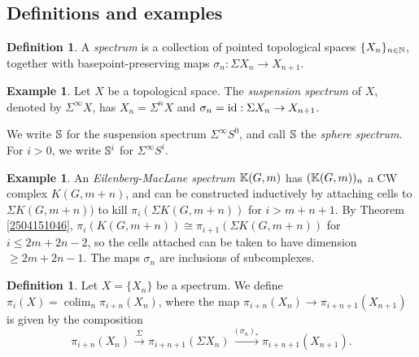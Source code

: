 \documentclass[11pt, titlepage]{article} %
\def\bb{\ensuremath\mathbb}
\def\nat{\ensuremath\mathbb{N}}
\def\id{\ensuremath\text{id}}
\DeclareMathOperator{\colim}{colim}
\numberwithin{equation}{subsection}
\theoremstyle{plain}
\theoremstyle{definition}
\newtheorem{definition}[theorem]{Definition}
\newtheorem{example}[theorem]{Example}
\begin{document}
\subsection{Definitions and examples}\label{2504291244}

\begin{definition}
A \textit{spectrum} is a collection of pointed topological spaces \(\{X_n\}_{n\in \nat}\), together with basepoint-preserving maps \(\sigma_n : \Sigma X_n \to X_{n+1}\).
\end{definition}

\begin{example}
Let \(X\) be a topological space. The \textit{suspension spectrum} of \(X\), denoted by \(\Sigma^\infty X\), has \(X_n=\Sigma^nX\) and \(\sigma_n=\id : \Sigma X_n \to X_{n+1}\).
\end{example}

We write \(\bb{S}\) for the suspension spectrum \(\Sigma^\infty S^0\), and call \(\bb{S}\) the \textit{sphere spectrum}. For \(i>0\), we write \(\bb{S}^i\) for \(\Sigma^\infty S^i\).%



\begin{example}\label{2504251659}
An \textit{Eilenberg-MacLane spectrum} \(\bb{K}(G,m)\) has \((\bb{K}(G,m))_n\) a CW complex \(K(G,m+n)\), and can be constructed inductively by attaching cells to \(\Sigma K(G, m+n))\) to kill \(\pi_i(\Sigma K(G, m+n))\) for \(i > m+n+1\). By Theorem \ref{2504151046}, \(\pi_i(K(G, m+n))\cong \pi_{i+1}(\Sigma K(G, m+n))\) for \(i \leq 2m+2n-2\), so the cells attached can be taken to have dimension \(\geq 2m+2n-1\). The maps \(\sigma_n\) are inclusions of subcomplexes. 
\end{example}


\begin{definition}
Let \(X=\{X_n\}\) be a spectrum. We define \(\pi_i(X)=\colim_n \pi_{i+n}(X_n)\), where the map \(\pi_{i+n}(X_n)\to \pi_{i+n+1}(X_{n+1})\) is given by the composition
\[\pi_{i+n}(X_n)\xrightarrow{\Sigma}\pi_{i+n+1}(\Sigma X_n)\xrightarrow{(\sigma_n)_*}\pi_{i+n+1}(X_{n+1}).\]
\end{definition}
\end{document}
